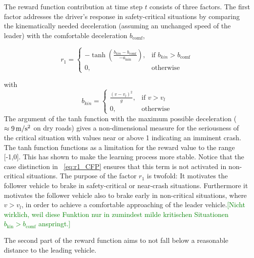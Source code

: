 \documentclass[review]{elsarticle}
\providecommand{\green}[1]{\textcolor{green}{#1}}
\providecommand{\martinc}[1]{\green{[#1]}} %
\providecommand{\sub}[1]{_{\mathrm{#1}}}  %
\providecommand{\3}{{\ss}}
\begin{document}
The reward function contribution at time step $t$ consists of three factors. 
The first factor addresses the driver's
response in safety-critical situations by comparing the
kinematically needed deceleration (assuming an
unchanged speed of the leader) with the
comfortable deceleration $b\sub{comf}$,



\begin{equation}
\label{eq:r1_CFP}
r_1 = 
\begin{cases}
-\tanh\left(\frac{b_{kin}-b\sub{comf}}{-a\sub{min}}\right),& \text{if } b_{kin}>b\sub{comf}\\
0,              & \text{otherwise}
\end{cases}
\end{equation}

with
\begin{equation}
\label{bkin}
b_{kin} = 
\begin{cases}
\frac{(v-v_l)^2}{g},& \text{if } v>v_l\\
0,              & \text{otherwise}
\end{cases}
\end{equation}
The argument of the tanh function with  the
maximum possible deceleration ($\approx \unit[9]{m/s^2}$ on dry roads) gives a
non-dimensional measure for the seriousness of the critical situation
with values 
near or above 1 indicating an imminent crash.  The tanh function functions as a limitation for the reward value to the range [-1,0]. This has shown to make the learning process more stable. Notice that the case distinction in ~\eqref{eq:r1_CFP}  ensures that
this term is not activated in non-critical situations. The purpose of
the factor $r_1$ is twofold: It motivates the follower vehicle to
brake in safety-critical or near-crash situations.  Furthermore it
motivates the follower vehicle also to brake early in non-critical
situations, where $ v>v_l$, in order to achieve a comfortable
approaching of the leader vehicle.\martinc{Nicht wirklich, weil diese
  Funktion nur in zumindest milde kritischen Situationen $b\sub{kin}>b\sub{comf}$ anspringt.}

The second part of the reward function aims to not fall below a reasonable
distance to the leading vehicle.
\end{document}

